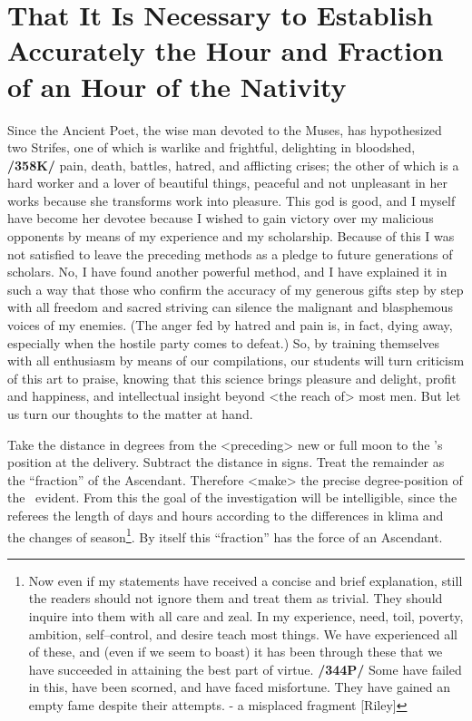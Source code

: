 \section{That It Is Necessary to Establish Accurately the Hour and Fraction of an Hour of the Nativity}

Since the Ancient Poet, the wise man devoted to the Muses, has hypothesized two Strifes, one of which is warlike and frightful, delighting in bloodshed, \textbf{/358K/} pain, death, battles, hatred, and afflicting crises; the other of which is a hard worker and a lover of beautiful things, peaceful and not unpleasant in her works because she transforms work into pleasure. This god is good, and I myself have become her devotee because I wished to gain victory over my malicious opponents by means of my experience and my scholarship. Because of this I was not satisfied to leave the preceding methods as a pledge to future generations of scholars. No, I have found another powerful method, and I have explained it in such a way that those who confirm the accuracy of my generous gifts step by step with all freedom and sacred striving can silence the malignant and blasphemous voices of my enemies. (The anger fed by hatred and pain is, in fact, dying away, especially when the hostile party comes to defeat.) So, by training themselves with all enthusiasm by means of our compilations, our students will turn criticism of this art to praise, knowing that this science brings pleasure and delight, profit and happiness, and intellectual insight beyond <the reach of> most men. But let us turn our thoughts to the matter at hand.

Take  the distance in degrees from the <preceding> new or full moon to the \Moon’s position at the delivery. Subtract the distance in signs. Treat the remainder as the “fraction” of the Ascendant. Therefore <make> the precise degree-position of the \Moon\, evident. From this the goal of the investigation will be intelligible, since the \Sun\, referees the length of days and hours according to the differences in klima and the changes of season\footnote{Now even if my statements have received a concise and brief explanation, still the readers should not ignore them and treat them as trivial. They should inquire into them with all care and zeal. In my experience, need, toil, poverty, ambition, self–control, and desire teach most things. We have experienced all of these, and (even if we seem to boast) it has been through these that we have succeeded in attaining the best part of virtue. \textbf{/344P/} Some have failed in this, have been scorned, and have faced misfortune. They have gained an empty fame despite their attempts. - a misplaced fragment [Riley]}. By itself this “fraction” has the force of an Ascendant. 

